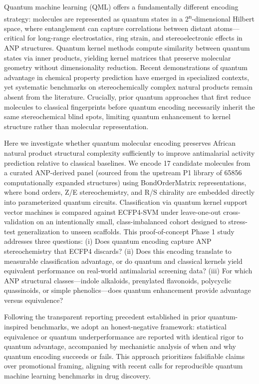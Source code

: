 Quantum machine learning (QML) offers a fundamentally different encoding strategy: molecules are represented as quantum states in a 2\textsuperscript{n}-dimensional Hilbert space, where entanglement can capture correlations between distant atoms—critical for long-range electrostatics, ring strain, and stereoelectronic effects in ANP structures. Quantum kernel methods\cite{havlicek2019supervised} compute similarity between quantum states via inner products, yielding kernel matrices that preserve molecular geometry without dimensionality reduction. Recent demonstrations of quantum advantage in chemical property prediction have emerged in specialized contexts\cite{boy2025,tilly2022variational}, yet systematic benchmarks on stereochemically complex natural products remain absent from the literature. Crucially, prior quantum approaches that first reduce molecules to classical fingerprints before quantum encoding\cite{sao2026p3} necessarily inherit the same stereochemical blind spots, limiting quantum enhancement to kernel structure rather than molecular representation.

Here we investigate whether quantum molecular encoding preserves African natural product structural complexity sufficiently to improve antimalarial activity prediction relative to classical baselines. We encode \num{17} candidate molecules from a curated ANP-derived panel (sourced from the upstream P1 library of \num{65856} computationally expanded structures\cite{sao2026p1}) using BondOrderMatrix representations\cite{boy2025}, where bond orders, Z/E stereochemistry, and R/S chirality are embedded directly into parameterized quantum circuits. Classification via quantum kernel support vector machines is compared against ECFP4-SVM under leave-one-out cross-validation on an intentionally small, class-imbalanced cohort designed to stress-test generalization to unseen scaffolds. This proof-of-concept Phase 1 study addresses three questions: (i) Does quantum encoding capture ANP stereochemistry that ECFP4 discards? (ii) Does this encoding translate to measurable classification advantage, or do quantum and classical kernels yield equivalent performance on real-world antimalarial screening data? (iii) For which ANP structural classes—indole alkaloids, prenylated flavonoids, polycyclic quassinoids, or simple phenolics—does quantum enhancement provide advantage versus equivalence?

Following the transparent reporting precedent established in prior quantum-inspired benchmarks\cite{sao2026p3}, we adopt an honest-negative framework: statistical equivalence or quantum underperformance are reported with identical rigor to quantum advantage, accompanied by mechanistic analysis of when and why quantum encoding succeeds or fails. This approach prioritizes falsifiable claims over promotional framing, aligning with recent calls for reproducible quantum machine learning benchmarks in drug discovery\cite{cao2022quantum}.

